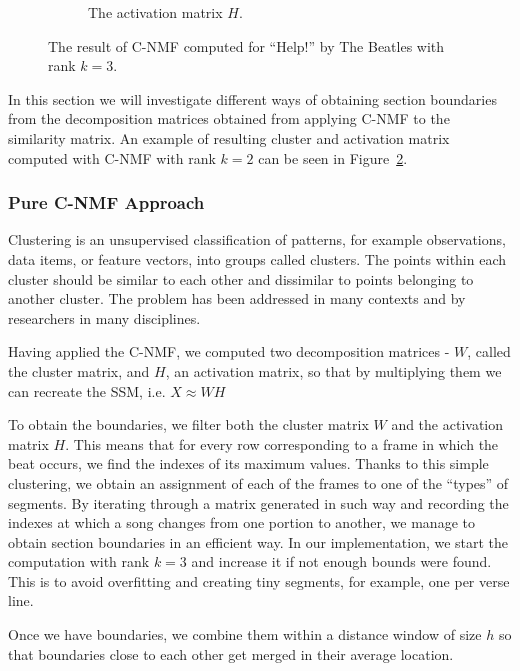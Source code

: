 \begin{figure}
\begin{subfigure}[b]{0.47\textwidth}
                \caption{The activation matrix $H$.}
                \label{fig:Hmatrix}
        \end{subfigure}
          \caption{The result of C-NMF computed for ``Help!'' by The Beatles with rank $k = 3$.}
        \label{fig:CNMFbeatles}
\end{figure}
 
In this section we will investigate different ways of obtaining section boundaries from the decomposition matrices obtained from applying C-NMF to the similarity matrix. An example of resulting cluster and activation matrix computed with C-NMF with rank $k = 2$ can be seen in Figure~\ref{fig:CNMFbeatles}.

\subsubsection*{Pure C-NMF Approach}
\label{sec:finalBounds}

Clustering is an unsupervised classification of patterns, for example observations, data items, or feature vectors, into groups called clusters. The points within each cluster should be similar to each other and dissimilar to points belonging to another cluster. The problem has been addressed in many contexts and by researchers in many disciplines.

Having applied the C-NMF, we computed two decomposition matrices - $W$, called the cluster matrix, and $H$, an activation matrix, so that by multiplying them we can recreate the SSM, i.e. $X \approx  WH$       
        
To obtain the boundaries, we filter both the cluster matrix $W$ and the activation matrix $H$. This means that for every row corresponding to a frame in which the beat occurs, we find the indexes of  its maximum values. Thanks to this simple clustering, we obtain an assignment of each of the frames to one of the ``types'' of segments. By iterating through a matrix generated in such way and recording the indexes at which a song changes from one portion to another, we manage to obtain section boundaries in an efficient way. In our implementation, we start the computation with rank $k = 3$ and increase it if not enough bounds were found. This is to avoid overfitting and creating tiny segments, for example, one per verse line.

Once we have boundaries, we combine them within a distance window of size $h$ so that boundaries close to each other get merged in their average location.

